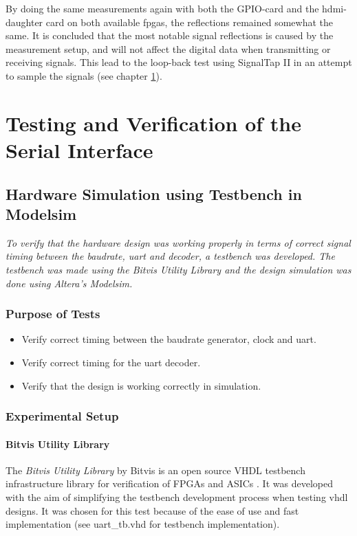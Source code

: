 \documentclass[main.tex]{subfiles}
\begin{document}
By doing the same measurements again with both the GPIO-card and the \gls{hdmi}-daughter card on both available \glspl{fpga}, the reflections remained somewhat the same. It is concluded that the most notable signal reflections is caused by the measurement setup, and will not affect the digital data when transmitting or receiving signals. This lead to the loop-back test using SignalTap II in an attempt to sample the signals (see chapter \ref{chap:sertest}).

\chapter{Testing and Verification of the Serial Interface} \label{chap:sertest}

\section{Hardware Simulation using Testbench in Modelsim}

\textit{To verify that the hardware design was working properly in terms of correct signal timing between the baudrate, \acrshort{uart} and decoder, a testbench was developed. The testbench was made using the \textit{Bitvis Utility Library} and the design simulation was done using Altera's Modelsim.}

\subsection{Purpose of Tests}

\begin{itemize}\setlength{\itemsep}{10pt}
\item Verify correct timing between the baudrate generator, clock and uart.
\item Verify correct timing for the uart decoder.
\item Verify that the design is working correctly in simulation.
\end{itemize}

\subsection{Experimental Setup}
\subsubsection{Bitvis Utility Library}
The \textit{Bitvis Utility Library} by Bitvis is an open source VHDL testbench infrastructure library for verification of FPGAs and ASICs \cite{bitvis16}. It was developed with the aim of simplifying the testbench development process when testing \acrshort{vhdl} designs. It was chosen for this test because of the ease of use and fast implementation (see uart\_tb.vhd for testbench implementation).\\
\end{document}

